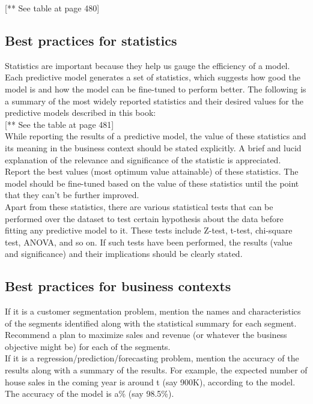\documentclass{article}
\numberwithin{equation}{section} %
\begin{document}
[** See table at page 480]

\subsection*{Best practices for statistics}

Statistics are important because they help us gauge the efficiency of a model. Each predictive model generates a set of statistics, which suggests how good the model is and how the model can be fine-tuned to perform better. The following is a summary of the most widely reported statistics and their desired values for the predictive models described in this book:\\

[** See the table at page 481] \\

While reporting the results of a predictive model, the value of these statistics and
its meaning in the business context should be stated explicitly. A brief and lucid
explanation of the relevance and significance of the statistic is appreciated. Report the best values (most optimum value attainable) of these statistics. The model should be fine-tuned based on the value of these statistics until the point that they can't be further improved. \\

Apart from these statistics, there are various statistical tests that can be performed over the dataset to test certain hypothesis about the data before fitting any predictive model to it. These tests include Z-test, t-test, chi-square test, ANOVA, and so on. If such tests have been performed, the results (value and significance) and their implications should be clearly stated. \\


\subsection*{Best practices for business contexts}

If it is a customer segmentation problem, mention the names and characteristics
of the segments identified along with the statistical summary for each segment.
Recommend a plan to maximize sales and revenue (or whatever the business
objective might be) for each of the segments. \\

If it is a regression/prediction/forecasting problem, mention the accuracy of the
results along with a summary of the results. For example, the expected number of
house sales in the coming year is around t (say 900K), according to the model. The
accuracy of the model is a\% (say 98.5\%). \\
\end{document}
